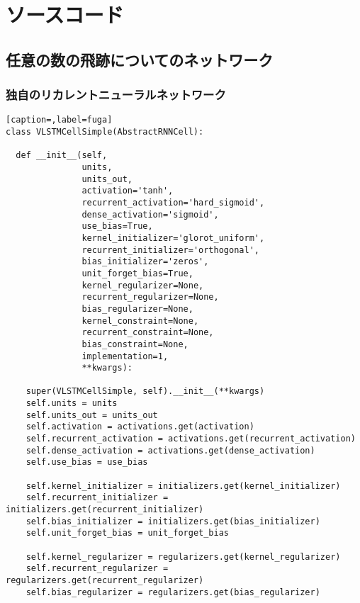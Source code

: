 
\appendix 

\chapter{ソースコード} \label{sec:Code}
\section{任意の数の飛跡についてのネットワーク} \label{sec:CodeVLSTM}
\subsection{独自のリカレントニューラルネットワーク} \label{sec:CodeVLSTM:Cell}
\begin{lstlisting}[caption=,label=fuga]
class VLSTMCellSimple(AbstractRNNCell):

  def __init__(self,
               units,
               units_out,
               activation='tanh',
               recurrent_activation='hard_sigmoid',
               dense_activation='sigmoid',
               use_bias=True,
               kernel_initializer='glorot_uniform',
               recurrent_initializer='orthogonal',
               bias_initializer='zeros',
               unit_forget_bias=True,
               kernel_regularizer=None,
               recurrent_regularizer=None,
               bias_regularizer=None,
               kernel_constraint=None,
               recurrent_constraint=None,
               bias_constraint=None,
               implementation=1,
               **kwargs):

    super(VLSTMCellSimple, self).__init__(**kwargs)
    self.units = units
    self.units_out = units_out
    self.activation = activations.get(activation)
    self.recurrent_activation = activations.get(recurrent_activation)
    self.dense_activation = activations.get(dense_activation)
    self.use_bias = use_bias

    self.kernel_initializer = initializers.get(kernel_initializer)
    self.recurrent_initializer = initializers.get(recurrent_initializer)
    self.bias_initializer = initializers.get(bias_initializer)
    self.unit_forget_bias = unit_forget_bias

    self.kernel_regularizer = regularizers.get(kernel_regularizer)
    self.recurrent_regularizer = regularizers.get(recurrent_regularizer)
    self.bias_regularizer = regularizers.get(bias_regularizer)


\end{lstlisting}
